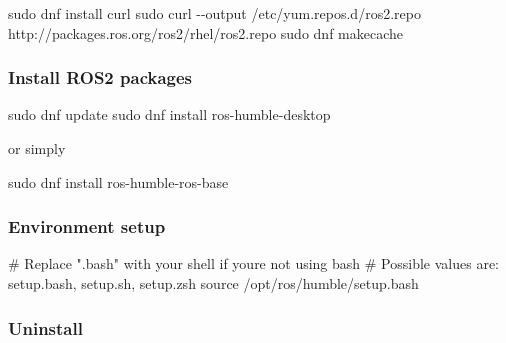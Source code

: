 \documentclass[
  letterpaper,
  DIV=11,
  numbers=noendperiod]{scrreprt}
\newenvironment{Shaded}{\begin{snugshade}}{\end{snugshade}}
\newcommand{\AttributeTok}[1]{\textcolor[rgb]{0.40,0.45,0.13}{#1}}
\newcommand{\BuiltInTok}[1]{\textcolor[rgb]{0.00,0.23,0.31}{#1}}
\newcommand{\CommentTok}[1]{\textcolor[rgb]{0.37,0.37,0.37}{#1}}
\newcommand{\FunctionTok}[1]{\textcolor[rgb]{0.28,0.35,0.67}{#1}}
\newcommand{\NormalTok}[1]{\textcolor[rgb]{0.00,0.23,0.31}{#1}}
\begin{document}
\begin{Shaded}
\begin{Highlighting}[]
\FunctionTok{sudo}\NormalTok{ dnf install curl}
\FunctionTok{sudo}\NormalTok{ curl }\AttributeTok{{-}{-}output}\NormalTok{ /etc/yum.repos.d/ros2.repo http://packages.ros.org/ros2/rhel/ros2.repo}
\FunctionTok{sudo}\NormalTok{ dnf makecache}
\end{Highlighting}
\end{Shaded}

\hypertarget{install-ros2-packages-1}{%
\subsubsection{Install ROS2 packages}\label{install-ros2-packages-1}}

\begin{Shaded}
\begin{Highlighting}[]
\FunctionTok{sudo}\NormalTok{ dnf update}
\FunctionTok{sudo}\NormalTok{ dnf install ros{-}humble{-}desktop}
\end{Highlighting}
\end{Shaded}

or simply

\begin{Shaded}
\begin{Highlighting}[]
\FunctionTok{sudo}\NormalTok{ dnf install ros{-}humble{-}ros{-}base}
\end{Highlighting}
\end{Shaded}

\hypertarget{environment-setup-1}{%
\subsubsection{Environment setup}\label{environment-setup-1}}

\begin{Shaded}
\begin{Highlighting}[]
\CommentTok{\# Replace ".bash" with your shell if you\textquotesingle{}re not using bash}
\CommentTok{\# Possible values are: setup.bash, setup.sh, setup.zsh}
\BuiltInTok{source}\NormalTok{ /opt/ros/humble/setup.bash}
\end{Highlighting}
\end{Shaded}

\hypertarget{uninstall-1}{%
\subsubsection{Uninstall}\label{uninstall-1}}
\end{document}
